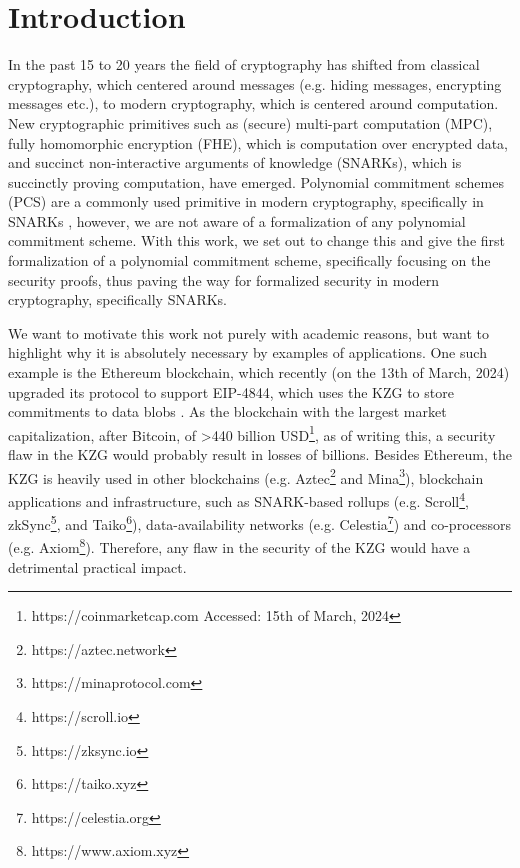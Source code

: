 
\chapter{Introduction}\label{chapter:introduction}
In the past 15 to 20 years the field of cryptography has shifted from classical cryptography, which centered around messages (e.g. hiding messages, encrypting messages etc.), to modern cryptography, which is centered around computation. New cryptographic primitives such as (secure) multi-part computation (MPC), fully homomorphic encryption (FHE), which is computation over encrypted data, and succinct non-interactive arguments of knowledge (SNARKs), which is succinctly proving computation, have emerged. Polynomial commitment schemes (PCS) are a commonly used primitive in modern cryptography, specifically in SNARKs \parencite{thalerbook,boneh_shoup}, however, we are not aware of a formalization of any polynomial commitment scheme. With this work, we set out to change this and give the first formalization of a polynomial commitment scheme, specifically focusing on the security proofs, thus paving the way for formalized security in modern cryptography, specifically SNARKs.

We want to motivate this work not purely with academic reasons, but want to highlight why it is absolutely necessary by examples of applications. One such example is the Ethereum blockchain, which recently (on the 13th of March, 2024) upgraded its protocol to support EIP-4844, which uses the KZG to store commitments to data blobs \parencite{EIP4844}. As the blockchain with the largest market capitalization, after Bitcoin, of >440 billion USD\footnote{https://coinmarketcap.com Accessed: 15th of March, 2024}, as of writing this, a security flaw in the KZG would probably result in losses of billions. Besides Ethereum, the KZG is heavily used in other blockchains (e.g. Aztec\footnote{https://aztec.network} and Mina\footnote{https://minaprotocol.com}), blockchain applications and infrastructure, such as SNARK-based rollups (e.g. Scroll\footnote{https://scroll.io}, zkSync\footnote{https://zksync.io}, and Taiko\footnote{https://taiko.xyz}), data-availability networks (e.g. Celestia\footnote{https://celestia.org}) and co-processors (e.g. Axiom\footnote{https://www.axiom.xyz}). Therefore, any flaw in the security of the KZG would have a detrimental practical impact. 

